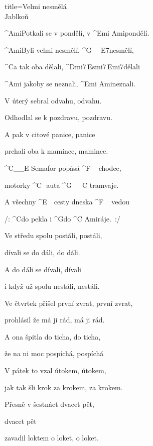 \begin{song}{title=\predtitle\centering Velmi nesmělá \\\large Jablkoň  \vspace*{-0.3cm}}  %
\begin{centerjustified}

\begin{varwidth}[t]{0.48\textwidth}\setlength{\parindent}{0.45cm}  %
\sloka
	^{Ami\z}Potkali se v pondělí, v ^{Emi Ami\z}pondělí.\:\:\:
	
	^{Ami}Byli velmi nesmělí, ^{G\,\,\,\,\,\,\,\,E7}nesmělí,
	
	^{C}a tak oba dělali, ^{Dmi7\,Esmi7\,Emi7}dělali
	
	^{Ami\,\,}jakoby se neznali, ^{Emi Ami\z}neznali.\:\:\:
	
	
\sloka
	V úterý sebral odvahu, odvahu.
	
	Odhodlal se k pozdravu, pozdravu.
	
	A pak v citové panice, panice
	
	prchali oba k mamince, mamince.

	^{C{\color{white}\_\_}E\,\,}Semafor popásá ^{F\,\,\,\,\,\,\,}chodce,
	
	motorky ^{C\,\,\,\,}auta ^{G\,\,\,\,\,\,\,\,\,C\,\,}tramvaje.
	
	A všechny ^{E\,\,\,\,\,\,}cesty dneska ^{F\,\,\,\,\,\,\,}vedou
	
	/: ^{C}do pekla i ^{G}do ^{C Ami\z}ráje.~:/
	
\sloka
	Ve středu spolu postáli, postáli,
	
	dívali se do dáli, do dáli.
	
	A do dáli se dívali, dívali
	
	i když už spolu nestáli, nestáli.
	

\sloka
	Ve čtvrtek přišel první zvrat, první zvrat,
	
	prohlásil že má ji rád, má ji rád.
	
	A ona špitla do ticha, do ticha,
	
	že na ni moc pospíchá, pospíchá


\sloka
	V pátek to vzal útokem, útokem,
	
	jak tak šli krok za krokem, za krokem.
	
	Přesně v šestnáct dvacet pět, 

	dvacet pět
	
	zavadil loktem o loket, o loket.


\end{varwidth}
\end{centerjustified}
\end{song}
